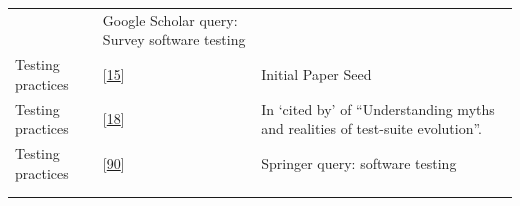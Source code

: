 \documentclass[]{book}
\begin{document}
\begin{longtable}[]{@{}lll@{}}
\begin{minipage}[t]{0.41\columnwidth}
\end{minipage} & \begin{minipage}[t]{0.32\columnwidth}\raggedright\strut
Google Scholar query: Survey software testing\strut
\end{minipage}\tabularnewline
\begin{minipage}[t]{0.19\columnwidth}\raggedright\strut
Testing practices\strut
\end{minipage} & \begin{minipage}[t]{0.41\columnwidth}\raggedright\strut
{[}\protect\hyperlink{ref-beller2017developer}{15}{]}\strut
\end{minipage} & \begin{minipage}[t]{0.32\columnwidth}\raggedright\strut
Initial Paper Seed\strut
\end{minipage}\tabularnewline
\begin{minipage}[t]{0.19\columnwidth}\raggedright\strut
Testing practices\strut
\end{minipage} & \begin{minipage}[t]{0.41\columnwidth}\raggedright\strut
{[}\protect\hyperlink{ref-beller2015}{18}{]}\strut
\end{minipage} & \begin{minipage}[t]{0.32\columnwidth}\raggedright\strut
In `cited by' of ``Understanding myths and realities of test-suite
evolution''.\strut
\end{minipage}\tabularnewline
\begin{minipage}[t]{0.19\columnwidth}\raggedright\strut
Testing practices\strut
\end{minipage} & \begin{minipage}[t]{0.41\columnwidth}\raggedright\strut
{[}\protect\hyperlink{ref-moiz2017uncertainty}{90}{]}\strut
\end{minipage} & \begin{minipage}[t]{0.32\columnwidth}\raggedright\strut
Springer query: software testing\strut
\end{minipage}\tabularnewline
\begin{minipage}[t]{0.19\columnwidth}\raggedright\strut
\strut
\end{minipage} & \begin{minipage}[t]{0.41\columnwidth}\raggedright\strut
\strut
\end{minipage} & \begin{minipage}[t]{0.32\columnwidth}\raggedright\strut
\strut
\end{minipage}\tabularnewline
\begin{minipage}[t]{0.19\columnwidth}\raggedright\strut

\end{minipage}
\end{longtable}
\end{document}
